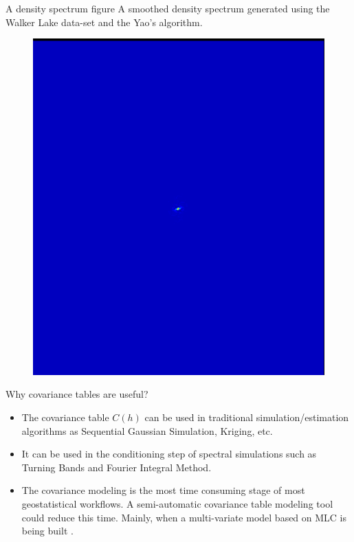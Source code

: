 \begin{frame}{A density spectrum figure}
A smoothed density spectrum generated using the Walker Lake data-set and the Yao's algorithm.
\begin{figure}[!ht]
  \centering
    \includegraphics[height=0.5\textheight]{figs/dens_spec.png}
    \label{dens_spec.fig}
\end{figure}
\end{frame}


\begin{frame}{Why covariance tables are useful?}
\begin{itemize}
\item The covariance table $C(h)$  can be used in traditional simulation/estimation algorithms as Sequential Gaussian Simulation, Kriging, etc.
\item It can be used in the conditioning step of spectral simulations such as Turning Bands and Fourier Integral Method.
\item The covariance modeling is the most time consuming stage of most geostatistical workflows. A semi-automatic covariance table modeling tool could reduce this time. Mainly, when a multi-variate model based on MLC  is being built \cite{cov.paper}.
\end{itemize}
\end{frame}

